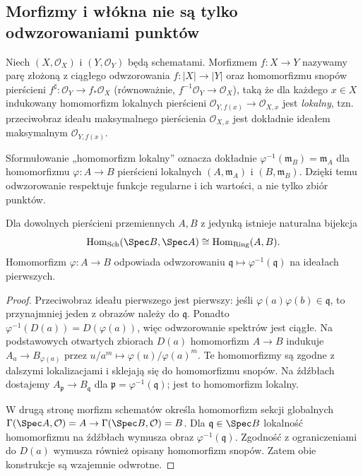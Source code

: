 \subsection{Morfizmy i włókna nie są tylko odwzorowaniami punktów}

\begin{definicja}
\label{def:ga5-morfizm}
Niech $(X,\mathcal O_X)$ i $(Y,\mathcal O_Y)$ będą schematami.
Morfizmem $f:X\to Y$ nazywamy parę złożoną z ciągłego odwzorowania
$f:|X|\to|Y|$ oraz homomorfizmu snopów pierścieni
$f^\sharp:\mathcal O_Y\to f_*\mathcal O_X$ (równoważnie,
$f^{-1}\mathcal O_Y\to\mathcal O_X$), taką że dla każdego $x\in X$
indukowany homomorfizm lokalnych pierścieni
$\mathcal O_{Y,f(x)}\to\mathcal O_{X,x}$ jest \emph{lokalny}, tzn.
przeciwobraz ideału maksymalnego pierścienia $\mathcal O_{X,x}$
jest dokładnie ideałem maksymalnym $\mathcal O_{Y,f(x)}$.
\end{definicja}

Sformułowanie „homomorfizm lokalny” oznacza dokładnie
$\varphi^{-1}(\mathfrak m_B)=\mathfrak m_A$ dla homomorfizmu
$\varphi:A\to B$ pierścieni lokalnych $(A,\mathfrak m_A)$ i
$(B,\mathfrak m_B)$. Dzięki temu odwzorowanie respektuje funkcje
regularne i ich wartości, a nie tylko zbiór punktów.

\begin{stwierdzenie}
\label{st:ga5-affine-morphism}
Dla dowolnych pierścieni przemiennych $A,B$ z jedynką istnieje
naturalna bijekcja
\[
 \operatorname{Hom}_{\mathrm{Sch}}(\Spec B,\Spec A)
 \cong\operatorname{Hom}_{\mathrm{Ring}}(A,B).
\]
Homomorfizm $\varphi:A\to B$ odpowiada odwzorowaniu
$\mathfrak q\mapsto\varphi^{-1}(\mathfrak q)$ na ideałach pierwszych.
\end{stwierdzenie}
\begin{proof}
Przeciwobraz ideału pierwszego jest pierwszy: jeśli
$\varphi(a)\varphi(b)\in\mathfrak q$, to przynajmniej jeden
z obrazów należy do $\mathfrak q$. Ponadto
$\varphi^{-1}(D(a))=D(\varphi(a))$, więc odwzorowanie spektrów
jest ciągłe. Na podstawowych otwartych zbiorach $D(a)$
homomorfizm $A\to B$ indukuje
$A_a\to B_{\varphi(a)}$ przez $u/a^m\mapsto\varphi(u)/\varphi(a)^m$.
Te homomorfizmy są zgodne z dalszymi lokalizacjami i sklejają się
do homomorfizmu snopów. Na źdźbłach dostajemy
$A_{\mathfrak p}\to B_{\mathfrak q}$ dla
$\mathfrak p=\varphi^{-1}(\mathfrak q)$; jest to homomorfizm lokalny.

W drugą stronę morfizm schematów określa homomorfizm sekcji
globalnych $\Gamma(\Spec A,\mathcal O)=A\to
\Gamma(\Spec B,\mathcal O)=B$. Dla $\mathfrak q\in\Spec B$
lokalność homomorfizmu na źdźbłach wymusza obraz
$\varphi^{-1}(\mathfrak q)$. Zgodność z ograniczeniami do
$D(a)$ wymusza również opisany homomorfizm snopów.
Zatem obie konstrukcje są wzajemnie odwrotne.
\end{proof}

